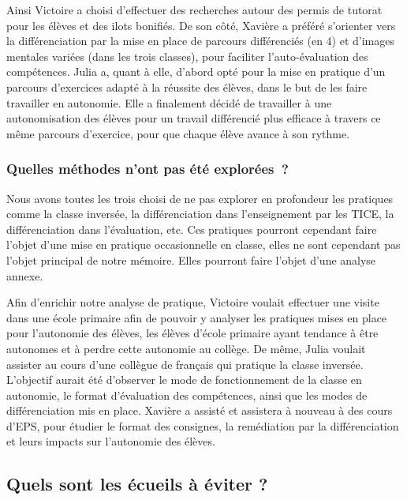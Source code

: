 Ainsi Victoire a choisi d’effectuer des recherches autour des permis de tutorat pour les élèves et des ilots bonifiés. De son côté, Xavière a préféré s’orienter vers la différenciation par la mise en place de parcours différenciés (en 4) et d’images mentales variées (dans les trois classes), pour faciliter l’auto-évaluation des compétences. Julia a, quant à elle, d’abord opté pour la mise en pratique d’un parcours d’exercices adapté à la réussite des élèves, dans le but de les faire travailler en autonomie. Elle a finalement décidé de travailler à une autonomisation des élèves pour un travail différencié plus efficace à travers ce même parcours d’exercice, pour que chaque élève avance à son rythme.

\subsubsection{Quelles méthodes n'ont pas été explorées ?}

Nous avons toutes les trois choisi de ne pas explorer en profondeur les pratiques comme la classe inversée, la différenciation dans l’enseignement par les TICE, la différenciation dans l’évaluation, etc. Ces pratiques pourront cependant faire l’objet d’une mise en pratique occasionnelle en classe, elles ne sont cependant pas l’objet principal de notre mémoire. Elles pourront faire l’objet d’une analyse annexe.

Afin d’enrichir notre analyse de pratique, Victoire voulait effectuer une visite dans une école primaire afin de pouvoir y analyser les pratiques mises en place pour l’autonomie des élèves, les élèves d’école primaire ayant tendance à être autonomes et à perdre cette autonomie au collège. De même, Julia voulait assister au cours d’une collègue de français qui pratique la classe inversée. L’objectif aurait été d’observer le mode de fonctionnement de la classe en autonomie, le format d’évaluation des compétences, ainsi que les modes de différenciation mis en place. Xavière a assisté et assistera à nouveau à des cours d’EPS, pour étudier le format des consignes, la remédiation par la différenciation et leurs impacts sur l’autonomie des élèves.

\subsection{Quels sont les écueils à éviter ?}


